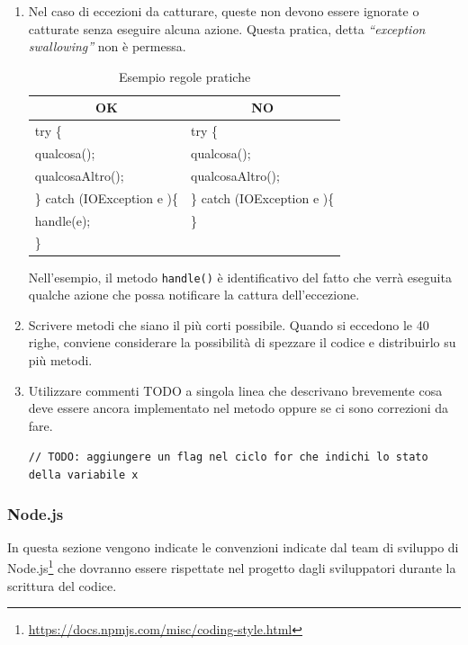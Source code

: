\begin{enumerate}
	\item Nel caso di eccezioni da catturare, queste non devono essere ignorate o catturate senza eseguire alcuna azione. Questa pratica, detta \emph{“exception swallowing”} non è permessa. 
	\begin{table} [H]
		\begin{center}
			\begin{tabular}{ | l | l |}
				\multicolumn{1}{c}{\textbf{OK}}&\multicolumn{1}{c}{\textbf{NO}}\\ 
				\hline
				try \{	& try \{\\
				\hspace{0.5cm} qualcosa(); & \hspace{0.5cm} qualcosa();\\
				\hspace{0.5cm} qualcosaAltro(); & \hspace{0.5cm} qualcosaAltro();\\
			    \} catch (IOException e )\{  & \} catch (IOException e )\{\\
			    \hspace{0.5cm} handle(e); & \}\\
			    \}&\\
	   			\hline
			\end{tabular}
		\end{center}
		\caption{Esempio regole pratiche}
	\end{table}
	Nell’esempio, il metodo \texttt{handle()} è identificativo del fatto che verrà eseguita qualche azione che possa notificare la cattura dell’eccezione.
	\item Scrivere metodi che siano il più corti possibile. Quando si eccedono le 40 righe, conviene considerare la possibilità di spezzare il codice e distribuirlo su più metodi.
	\item Utilizzare commenti TODO a singola linea che descrivano brevemente cosa deve essere ancora implementato nel metodo oppure se ci sono correzioni da fare.  
	
	\begin{flushleft}
	\texttt{// TODO: aggiungere un flag nel ciclo for che indichi lo stato della variabile x}
	\end{flushleft}

\end{enumerate}

\subsubsection{Node.js}
In questa sezione vengono indicate le convenzioni indicate dal team di sviluppo di Node.js\footnote{\href{https://docs.npmjs.com/misc/coding-style.html}{https://docs.npmjs.com/misc/coding-style.html}} che dovranno essere rispettate nel progetto dagli sviluppatori durante la scrittura del codice.
